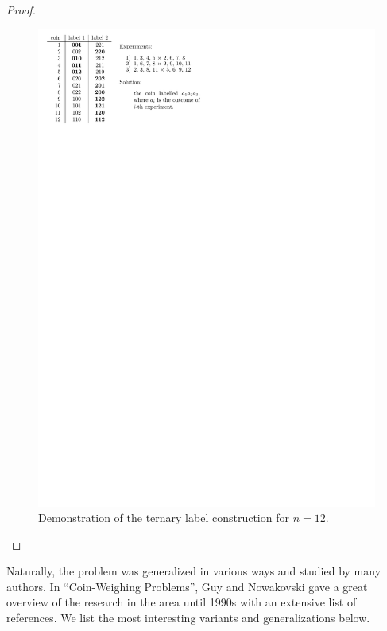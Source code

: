 \begin{proof}
\begin{figure}
\begin{center}
\includegraphics{pictures/coins12-th.pdf}
\end{center}
\caption{Demonstration of the ternary label construction for $n=12$.}
\label{fig:coins12scheme}
\end{figure}
\end{proof}

Naturally, the problem was generalized in various ways and
  studied by many authors.
In ``Coin-Weighing Problems''\cite{coins-cwproblems1995}, Guy and Nowakovski
  gave a great overview of the research in the area until 1990s
  with an extensive list of references.
We list the most interesting variants and generalizations below.

